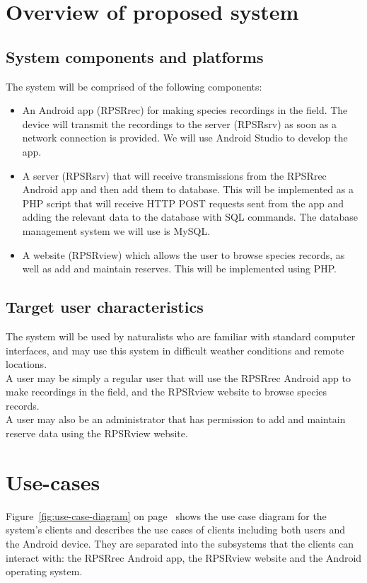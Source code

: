 \documentclass[12pt]{article}
\begin{document}
\section{Overview of proposed system}

	\subsection{System components and platforms}
		The system will be comprised of the following components:
		\begin{itemize}
			\item An Android app (RPSRrec) for making species recordings in the field. The device will transmit the recordings to the server (RPSRsrv) as soon as a network connection is provided. We will use Android Studio to develop the app.
			\item A server (RPSRsrv) that will receive transmissions from the RPSRrec Android app and then add them to database. This will be implemented as a PHP script that will receive HTTP POST requests sent from the app and adding the relevant data to the database with SQL commands. The database management system we will use is MySQL.
			\item A website (RPSRview) which allows the user to browse species records, as well as add and maintain reserves. This will be implemented using PHP.
		\end{itemize}

	\subsection{Target user characteristics}
		The system will be used by naturalists who are familiar with standard computer interfaces, and may use this system in difficult weather conditions and remote locations.\\
		A user may be simply a regular user that will use the RPSRrec Android app to make recordings in the field, and the RPSRview website to browse species records.\\
		A user may also be an administrator that has permission to add and maintain reserve data using the RPSRview website.

\section{Use-cases}
	Figure~\ref{fig:use-case-diagram} on page~\pageref{fig:use-case-diagram} shows the use case diagram for the system's clients and describes the use cases of clients including both users and the Android device. They are separated into the subsystems that the clients can interact with: the RPSRrec Android app, the RPSRview website and the Android operating system.
\end{document}
